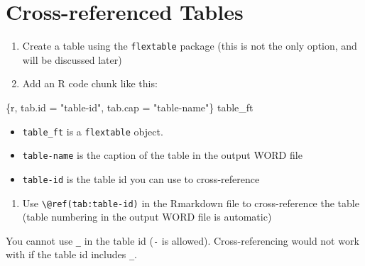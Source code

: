 \documentclass[
  letterpaper,
  DIV=11,
  numbers=noendperiod]{scrreprt}
\newenvironment{Shaded}{\begin{snugshade}}{\end{snugshade}}
\newcommand{\InformationTok}[1]{\textcolor[rgb]{0.37,0.37,0.37}{#1}}
\newcommand{\NormalTok}[1]{\textcolor[rgb]{0.00,0.23,0.31}{#1}}
\providecommand{\tightlist}{%
  \setlength{\itemsep}{0pt}\setlength{\parskip}{0pt}}\usepackage{longtable,booktabs,array}
\begin{document}
\hypertarget{cross-referenced-tables}{%
\section{Cross-referenced Tables}\label{cross-referenced-tables}}

\begin{enumerate}
\def\labelenumi{\arabic{enumi}.}
\item
  Create a table using the \texttt{flextable} package (this is not the
  only option, and will be discussed later)
\item
  Add an R code chunk like this:
\end{enumerate}

\begin{Shaded}
\begin{Highlighting}[]
\InformationTok{\textasciigrave{}\textasciigrave{}\textasciigrave{}\{r, tab.id = "table{-}id", tab.cap = "table{-}name"\}}
\NormalTok{table\_ft}
\InformationTok{\textasciigrave{}\textasciigrave{}\textasciigrave{}}
\end{Highlighting}
\end{Shaded}

\begin{itemize}
\tightlist
\item
  \texttt{table\_ft} is a \texttt{flextable} object.
\item
  \texttt{table-name} is the caption of the table in the output WORD
  file
\item
  \texttt{table-id} is the table id you can use to cross-reference
\end{itemize}

\begin{enumerate}
\def\labelenumi{\arabic{enumi}.}
\setcounter{enumi}{2}
\tightlist
\item
  Use \texttt{\textbackslash{}@ref(tab:table-id)} in the Rmarkdown file
  to cross-reference the table (table numbering in the output WORD file
  is automatic)
\end{enumerate}

\begin{tcolorbox}[enhanced jigsaw, colframe=quarto-callout-important-color-frame, toptitle=1mm, colbacktitle=quarto-callout-important-color!10!white, toprule=.15mm, colback=white, arc=.35mm, bottomtitle=1mm, opacitybacktitle=0.6, breakable, left=2mm, coltitle=black, leftrule=.75mm, title=\textcolor{quarto-callout-important-color}{\faExclamation}\hspace{0.5em}{Important}, rightrule=.15mm, titlerule=0mm, opacityback=0, bottomrule=.15mm]

You cannot use \texttt{\_} in the table id (\texttt{-} is allowed).
Cross-referencing would not work with if the table id includes
\texttt{\_}.

\end{tcolorbox}
\end{document}

